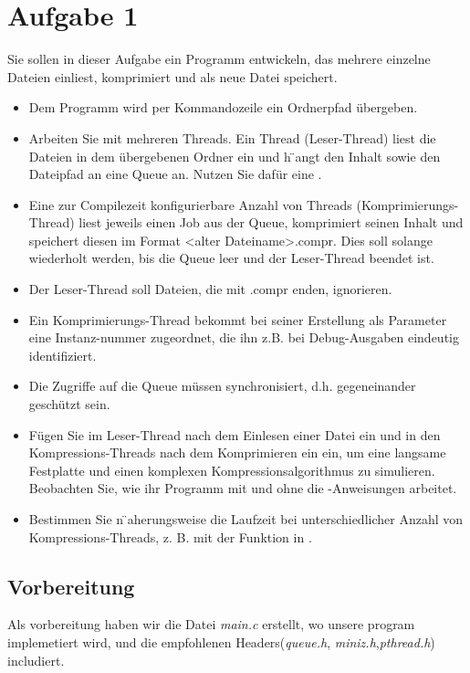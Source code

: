 \section{Aufgabe 1}
Sie sollen in dieser Aufgabe ein Programm entwickeln, das mehrere einzelne Dateien einliest,
komprimiert und als neue Datei speichert.
\begin{itemize}
	\item Dem Programm wird per Kommandozeile ein Ordnerpfad übergeben.
	\item Arbeiten Sie mit mehreren Threads. Ein Thread (Leser-Thread) liest die Dateien in dem
	übergebenen Ordner ein und h ̈angt den Inhalt sowie den Dateipfad an eine Queue an.
	Nutzen Sie dafür eine .
	\item Eine zur Compilezeit konfigurierbare Anzahl von Threads (Komprimierungs-Thread) liest
	jeweils einen Job aus der Queue, komprimiert seinen Inhalt und speichert diesen
	im Format <alter Dateiname>.compr. Dies soll solange wiederholt werden,
	bis die Queue leer und der Leser-Thread beendet ist.
	\item Der Leser-Thread soll Dateien, die mit .compr enden, ignorieren.
	\item Ein Komprimierungs-Thread bekommt bei seiner Erstellung als Parameter eine
	Instanz-nummer zugeordnet, die ihn z.B. bei Debug-Ausgaben eindeutig identifiziert.
	\item Die Zugriffe auf die Queue müssen synchronisiert, d.h. gegeneinander geschützt sein.
	\item  Fügen Sie im Leser-Thread nach dem Einlesen einer Datei ein  und in den
	Kompressions-Threads nach dem Komprimieren ein   ein, um eine langsame Festplatte
	und einen komplexen Kompressionsalgorithmus zu simulieren. Beobachten Sie, wie ihr Programm mit
	und ohne die -Anweisungen arbeitet.
	\item Bestimmen Sie n ̈aherungsweise die Laufzeit bei unterschiedlicher Anzahl von
	Kompressions-Threads, z. B. mit der Funktion  in .

\end{itemize}
	\subsection{Vorbereitung}
	Als vorbereitung haben wir die Datei \textit{main.c} erstellt, wo unsere program implemetiert wird,
	und die empfohlenen Headers(\textit{queue.h}, \textit{miniz.h},\textit{pthread.h}) includiert.
